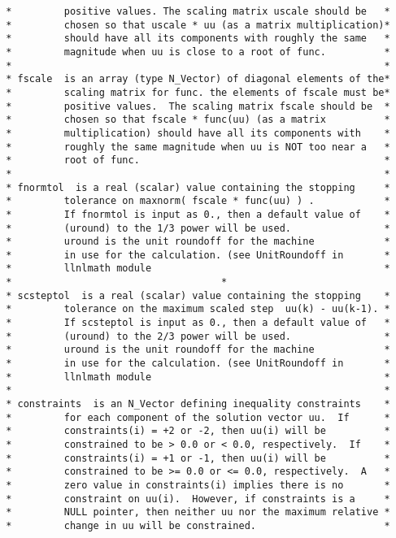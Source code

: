 \documentclass[11pt]{article}
\begin{document}
\begin{verbatim}
 *         positive values. The scaling matrix uscale should be   *
 *         chosen so that uscale * uu (as a matrix multiplication)*
 *         should have all its components with roughly the same   *
 *         magnitude when uu is close to a root of func.          *
 *                                                                *
 * fscale  is an array (type N_Vector) of diagonal elements of the*
 *         scaling matrix for func. the elements of fscale must be*
 *         positive values.  The scaling matrix fscale should be  *
 *         chosen so that fscale * func(uu) (as a matrix          *
 *         multiplication) should have all its components with    *
 *         roughly the same magnitude when uu is NOT too near a   *
 *         root of func.                                          *
 *                                                                *
 * fnormtol  is a real (scalar) value containing the stopping     *
 *         tolerance on maxnorm( fscale * func(uu) ) .            *
 *         If fnormtol is input as 0., then a default value of    *
 *         (uround) to the 1/3 power will be used.                *
 *         uround is the unit roundoff for the machine            *
 *         in use for the calculation. (see UnitRoundoff in       *
 *         llnlmath module                                        *
 *                                    *
 * scsteptol  is a real (scalar) value containing the stopping    *
 *         tolerance on the maximum scaled step  uu(k) - uu(k-1). *
 *         If scsteptol is input as 0., then a default value of   *
 *         (uround) to the 2/3 power will be used.                *
 *         uround is the unit roundoff for the machine            *
 *         in use for the calculation. (see UnitRoundoff in       *
 *         llnlmath module                                        *
 *                                                                *
 * constraints  is an N_Vector defining inequality constraints    *
 *         for each component of the solution vector uu.  If      *
 *         constraints(i) = +2 or -2, then uu(i) will be          *
 *         constrained to be > 0.0 or < 0.0, respectively.  If    *
 *         constraints(i) = +1 or -1, then uu(i) will be          *
 *         constrained to be >= 0.0 or <= 0.0, respectively.  A   *
 *         zero value in constraints(i) implies there is no       *
 *         constraint on uu(i).  However, if constraints is a     *
 *         NULL pointer, then neither uu nor the maximum relative *
 *         change in uu will be constrained.                      *

\end{verbatim}
\end{document}
